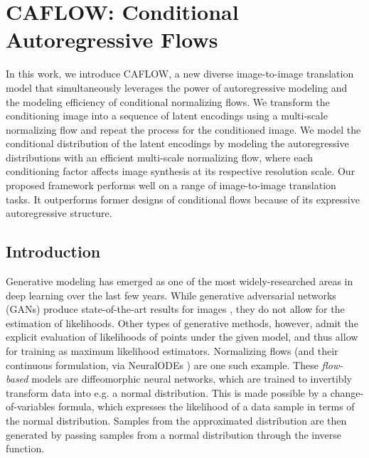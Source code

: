 
\chapter{CAFLOW: Conditional Autoregressive Flows}  %

\ifpdf
    \graphicspath{{Chapter1/Figs/Raster/}{Chapter1/Figs/PDF/}{Chapter1/Figs/}}
\else
    \graphicspath{{Chapter1/Figs/Vector/}{Chapter1/Figs/}}
\fi

In this work, we introduce CAFLOW, a new diverse image-to-image translation model that simultaneously leverages the power of autoregressive modeling and the modeling efficiency of conditional normalizing flows. We transform the conditioning image into a sequence of latent encodings using a multi-scale normalizing flow and repeat the process for the conditioned image. We model the conditional distribution of the latent encodings by modeling the autoregressive distributions with an efficient multi-scale normalizing flow, where each conditioning factor affects image synthesis at its respective resolution scale. Our proposed framework performs well on a range of image-to-image translation tasks. It outperforms former designs of conditional flows because of its expressive autoregressive structure.

\section{Introduction}

Generative modeling has emerged as one of the most widely-researched areas in deep learning over the last few years. While generative adversarial networks (GANs) \cite{GANs} produce state-of-the-art results for images \cite{viazovetskyi2020stylegan2}, they do not allow for the estimation of likelihoods. Other types of generative methods, however, admit the explicit evaluation of likelihoods of points under the given model, and thus allow for training as maximum likelihood estimators. Normalizing flows \cite{rezende2015variational} (and their continuous formulation, via NeuralODEs \cite{neuralODEs}) are one such example. These \emph{flow-based} models are diffeomorphic neural networks, which are trained to invertibly transform data into e.g. a normal distribution. This is made possible by a change-of-variables formula, which expresses the likelihood of a data sample in terms of the normal distribution. Samples from the approximated distribution are then generated by passing samples from a normal distribution through the inverse function.

